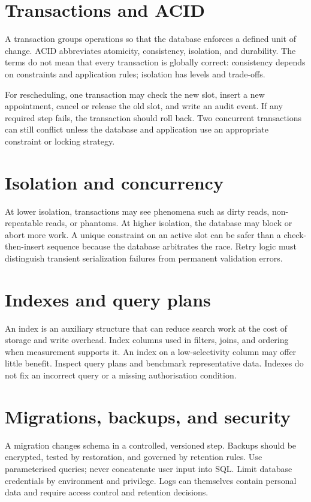\section{Transactions and ACID}
A transaction groups operations so that the database enforces a defined unit of change. ACID abbreviates atomicity, consistency, isolation, and durability. The terms do not mean that every transaction is globally correct: consistency depends on constraints and application rules; isolation has levels and trade-offs.

For rescheduling, one transaction may check the new slot, insert a new appointment, cancel or release the old slot, and write an audit event. If any required step fails, the transaction should roll back. Two concurrent transactions can still conflict unless the database and application use an appropriate constraint or locking strategy.

\section{Isolation and concurrency}
At lower isolation, transactions may see phenomena such as dirty reads, non-repeatable reads, or phantoms. At higher isolation, the database may block or abort more work. A unique constraint on an active slot can be safer than a check-then-insert sequence because the database arbitrates the race. Retry logic must distinguish transient serialization failures from permanent validation errors.

\section{Indexes and query plans}
An index is an auxiliary structure that can reduce search work at the cost of storage and write overhead. Index columns used in filters, joins, and ordering when measurement supports it. An index on a low-selectivity column may offer little benefit. Inspect query plans and benchmark representative data. Indexes do not fix an incorrect query or a missing authorisation condition.

\section{Migrations, backups, and security}
A migration changes schema in a controlled, versioned step. Backups should be encrypted, tested by restoration, and governed by retention rules. Use parameterised queries; never concatenate user input into SQL. Limit database credentials by environment and privilege. Logs can themselves contain personal data and require access control and retention decisions.


